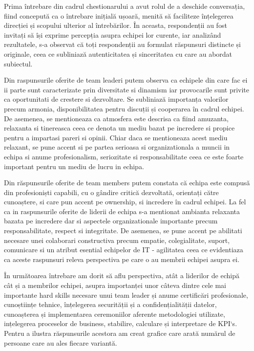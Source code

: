 \documentclass[a4paper, 12pt]{article}
\begin{document}
\begin{enumerate}[A)]
	\quad Prima întrebare din cadrul chestionarului a avut rolul de a deschide conversația, fiind concepută ca o întrebare inițială ușoară, menită să faciliteze înțelegerea direcției și scopului ulterior al întrebărilor. În aceasta, respondenții au fost invitați să își exprime percepția asupra echipei lor curente, iar  analizând rezultatele, s-a observat că toți respondenții au formulat răspunsuri distincte și originale, ceea ce subliniază autenticitatea și sinceritatea cu care au abordat subiectul.

	\quad Din raspunsurile oferite de team leaderi putem observa ca echipele din care fac ei ii parte sunt caracterizate prin diversitate si dinamism iar provocarile sunt privite ca oportunitati de crestere si dezvoltare. Se subliniază importanța valorilor precum armonia, disponibilitatea pentru discuții și cooperarea în cadrul echipei. De asemenea, se mentioneaza ca atmosfera este descrisa ca fiind amuzanta, relaxanta si tinereasca ceea ce denota un mediu bazat pe incredere si propice pentru a impartasi pareri si opinii. Chiar daca se mentioneaza acest mediu relaxant, se pune accent si pe partea serioasa si organizationala a muncii in echipa si anume profesionalism, seriozitate si responsabilitate ceea ce este foarte important pentru un mediu de lucru in echipa.

	\quad Din răspunsurile oferite de team members putem constata că echipa este compusă din profesioniști capabili, cu o gândire critică dezvoltată, orientați către cunoaștere, si care pun accent pe ownership, si incredere în cadrul echipei. La fel ca in raspunsurile oferite de liderii de echipa s-a mentionat ambianta relaxanta bazata pe incredere dar si aspectele organizationale importante precum responsabilitate, respect si integritate. De asemenea, se pune accent pe abilitati necesare unei colaborari constructiva precum empatie, colegialitate, suport,  comunicare si un atribut esential echipelor de IT - agilitatea ceea ce evidentiaza ca aceste raspunsuri releva perspectiva pe care o au membrii echipei asupra ei.


	\quad În următoarea întrebare am dorit să aflu perspectiva, atât a liderilor de echipă cât și a membrilor echipei, asupra importanței unor câteva dintre cele mai importante hard skills necesare unui team leader și anume certificări profesionale, cunoștiințe tehnice, înțelegerea securității și a confidențialității datelor,  cunoașterea și implementarea ceremoniilor aferente metodologiei utilizate, ințelegerea proceselor de business, stabilire, calculare și interpretare de KPI`s. Pentru a ilustra răspunsurile acestora am creat grafice care arată numărul de persoane care au ales fiecare variantă.


\end{enumerate}
\end{document}
